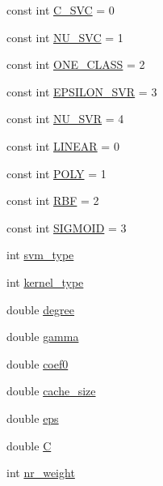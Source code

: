 \begin{DoxyCompactItemize}
\item 
const int \hyperlink{classlibsvm_1_1svm__parameter_af3a981d772ced251e35571cd10c3ab16}{C\_\-SVC} = 0
\item 
const int \hyperlink{classlibsvm_1_1svm__parameter_a0af329ff5d9af7ce423d9e04180bf0a3}{NU\_\-SVC} = 1
\item 
const int \hyperlink{classlibsvm_1_1svm__parameter_a0eb39c0832cbb9b9b9a6f99943f4aa24}{ONE\_\-CLASS} = 2
\item 
const int \hyperlink{classlibsvm_1_1svm__parameter_ab7601237a153a0e1fa3806107a9a60e6}{EPSILON\_\-SVR} = 3
\item 
const int \hyperlink{classlibsvm_1_1svm__parameter_a1c945358a3603fb7279b78f1afdde917}{NU\_\-SVR} = 4
\item 
const int \hyperlink{classlibsvm_1_1svm__parameter_ab7e7db4ec8af501a4d47aca15573c4b7}{LINEAR} = 0
\item 
const int \hyperlink{classlibsvm_1_1svm__parameter_acbee6b3c62134b0775ff51ceac95056b}{POLY} = 1
\item 
const int \hyperlink{classlibsvm_1_1svm__parameter_a2bbce6717a86b966604e0a198955b3e2}{RBF} = 2
\item 
const int \hyperlink{classlibsvm_1_1svm__parameter_a72a669e28a3d474626e204d13bd6a88d}{SIGMOID} = 3
\item 
int \hyperlink{classlibsvm_1_1svm__parameter_aad3fe1b0e94af81ddbfc792fa95e619e}{svm\_\-type}
\item 
int \hyperlink{classlibsvm_1_1svm__parameter_af0bd5118e26640a12e80cfea463f6a05}{kernel\_\-type}
\item 
double \hyperlink{classlibsvm_1_1svm__parameter_a0409f4308411db81d44e2b3b007d494e}{degree}
\item 
double \hyperlink{classlibsvm_1_1svm__parameter_aabbd71665d64cc45e2ed66079cce2b6b}{gamma}
\item 
double \hyperlink{classlibsvm_1_1svm__parameter_aaae3b57325334aaa0b7cd678fc2d14a9}{coef0}
\item 
double \hyperlink{classlibsvm_1_1svm__parameter_a0a8d8323860d2390dd7833ee49efe541}{cache\_\-size}
\item 
double \hyperlink{classlibsvm_1_1svm__parameter_adcd4c2ba2946d022e3a4d342e2b2da8f}{eps}
\item 
double \hyperlink{classlibsvm_1_1svm__parameter_a86f58fa624fdfd3aef024cc9543a65b0}{C}
\item 
int \hyperlink{classlibsvm_1_1svm__parameter_a2a36d1565cbc0106f87f0c9abed6c3fa}{nr\_\-weight}

\end{DoxyCompactItemize}
